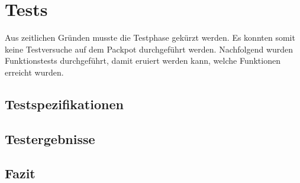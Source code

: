 \chapter{Tests}
\label{chap:Tests}

Aus zeitlichen Gründen musste die Testphase gekürzt werden. Es konnten somit keine Testversuche auf dem Packpot durchgeführt werden. Nachfolgend wurden Funktionstests durchgeführt, damit eruiert werden kann, welche Funktionen erreicht wurden.

\section{Testspezifikationen}
\label{sec:Testprotokolle}



\section {Testergebnisse}
\label{sec:Testergebnisse}

\section{Fazit}
\label{sec:Fazit}